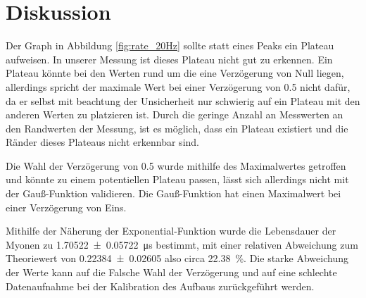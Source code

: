 \section{Diskussion}
\label{sec:Diskussion}

Der Graph in Abbildung \ref{fig:rate_20Hz} sollte statt eines Peaks ein Plateau aufweisen.
In unserer Messung ist dieses Plateau nicht gut zu erkennen.
Ein Plateau könnte bei den Werten rund um die eine Verzögerung von Null liegen, allerdings spricht der maximale Wert bei einer Verzögerung von \num{0.5} nicht dafür, da er selbst mit beachtung der Unsicherheit nur schwierig auf ein Plateau mit den anderen Werten zu platzieren ist.
Durch die geringe Anzahl an Messwerten an den Randwerten der Messung, ist es möglich, dass ein Plateau existiert und die Ränder dieses Plateaus nicht erkennbar sind.

Die Wahl der Verzögerung von \num{0.5} wurde mithilfe des Maximalwertes getroffen und könnte zu einem potentiellen Plateau passen, lässt sich allerdings nicht mit der Gauß-Funktion validieren.
Die Gauß-Funktion hat einen Maximalwert bei einer Verzögerung von Eins.

Mithilfe der Näherung der Exponential-Funktion wurde die Lebensdauer der Myonen zu \SI{1.70522+-0.05722}{\micro\second} bestimmt, mit einer relativen Abweichung zum Theoriewert von \num{0.22384 +- 0.02605} also circa \SI{22.38}{\percent}.
Die starke Abweichung der Werte kann auf die Falsche Wahl der Verzögerung und auf eine schlechte Datenaufnahme bei der Kalibration des Aufbaus zurückgeführt werden.